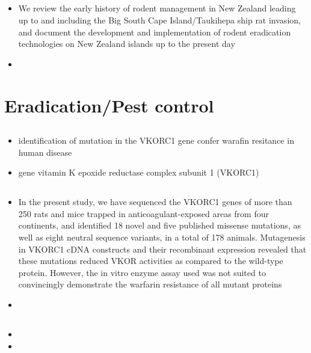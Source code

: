 \documentclass[document.tex]{subfiles}
\begin{document}
    \subsection{}
    \begin{itemize}
    \item We review the early history of rodent management in New Zealand leading
    up to and including the Big South Cape Island/Taukihepa ship rat invasion, and document the development
    and implementation of rodent eradication technologies on New Zealand islands up to the present day
    \item 
    \end{itemize}

\section{Eradication/Pest control}

\subsection{}
    \begin{itemize}
    \item identification of mutation in the VKORC1 gene confer warafin resitance in human disease
    \item gene vitamin K epoxide reductase complex subunit 1 (VKORC1)
    \end{itemize}

    \subsection{}
    \begin{itemize}
    \item In the present study, we have sequenced the VKORC1 genes of more than 250 rats and mice trapped in anticoagulant-exposed areas from four continents, and identified 18 novel and five published missense mutations, as well as eight neutral sequence variants, in a total of 178 animals. Mutagenesis in VKORC1 cDNA constructs and their recombinant expression revealed that these mutations reduced VKOR activities as compared to the wild-type protein. However, the in vitro enzyme assay used was not suited to convincingly demonstrate the warfarin resistance of all mutant proteins
    \item 
    \end{itemize}

    \subsection{\citetitle{}}
    \begin{itemize}
    \item 
    \item 
    \end{itemize}

\bib{}
    
\end{document}
